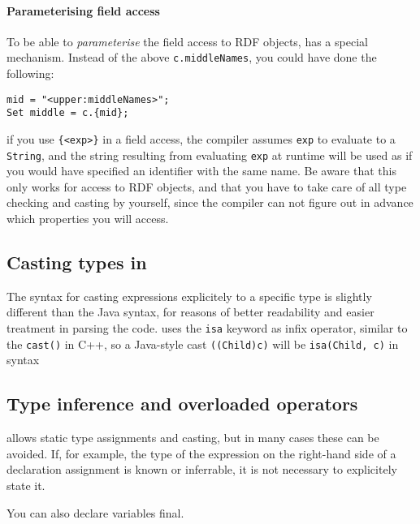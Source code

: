 \paragraph{Parameterising field access}\label{sec:field_access_expansion}

To be able to \emph{parameterise} the field access to RDF objects,
\vonda has a special mechanism. Instead of the above
\texttt{c.middleNames}, you could have done the following:

\begin{lstlisting}
mid = "<upper:middleNames>";
Set middle = c.{mid};
\end{lstlisting}

if you use \verb|{<exp>}| in a field access, the compiler assumes
\texttt{exp} to evaluate to a \texttt{String}, and the string
resulting from evaluating \texttt{exp} at runtime will be used as if
you would have specified an identifier with the same name. Be aware
that this only works for access to RDF objects, and that you have to
take care of all type checking and casting by yourself, since the
compiler can not figure out in advance which properties you will access.

\subsection{Casting types in \vonda}
\label{sec:cast}

The syntax for casting expressions explicitely to a specific type is
slightly different than the Java syntax, for reasons of better
readability and easier treatment in parsing the code. \vonda uses the
\texttt{isa} keyword as infix operator, similar to the \texttt{cast()}
in C++, so a Java-style cast \texttt{((Child)c)} will be
\texttt{isa(Child, c)} in \vonda syntax

\subsection{Type inference and overloaded operators}
\label{sec:typeinference}

\vonda allows static type assignments and casting, but in many cases these can
be avoided. If, for example, the type of the expression on the right-hand side
of a declaration assignment is known or inferrable, it is not necessary to
explicitely state it.

You can also declare variables final.


